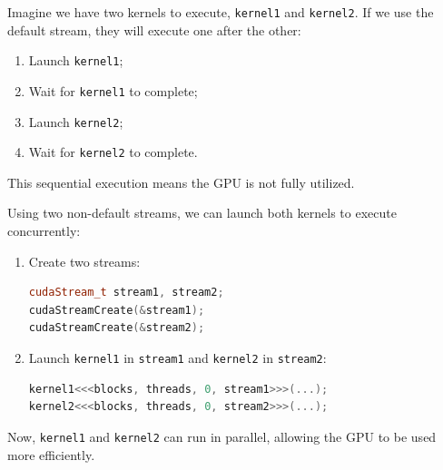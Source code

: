 \begin{examplebox}
    Imagine we have two kernels to execute, \texttt{kernel1} and \texttt{kernel2}. If we use the default stream, they will execute one after the other:
    \begin{enumerate}
        \item Launch \texttt{kernel1};
        \item Wait for \texttt{kernel1} to complete;
        \item Launch \texttt{kernel2};
        \item Wait for \texttt{kernel2} to complete.
    \end{enumerate}

    This sequential execution means the GPU is not fully utilized.

    Using two non-default streams, we can launch both kernels to execute concurrently:

    \begin{enumerate}
        \item Create two streams:
        \begin{lstlisting}[language=C++]
cudaStream_t stream1, stream2;
cudaStreamCreate(&stream1);
cudaStreamCreate(&stream2);\end{lstlisting}

        \item Launch \texttt{kernel1} in \texttt{stream1} and \texttt{kernel2} in \texttt{stream2}:
        \begin{lstlisting}[language=C++]
kernel1<<<blocks, threads, 0, stream1>>>(...);
kernel2<<<blocks, threads, 0, stream2>>>(...);\end{lstlisting}
    \end{enumerate}

    Now, \texttt{kernel1} and \texttt{kernel2} can run in parallel, allowing the GPU to be used more efficiently.
\end{examplebox}

\newpage


